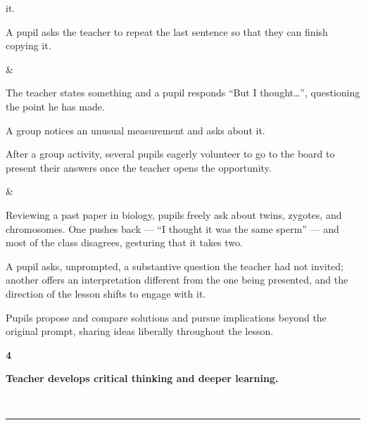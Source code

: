 \documentclass[10pt,a4paper]{article}
\newcommand{\exlistsize}{\scriptsize}
\newcommand{\conceptheader}[2]{%
  \noindent
  \begin{minipage}[c]{13mm}\raggedright
    {\fontsize{30}{30}\selectfont\bfseries\color{tnavy}#1}
  \end{minipage}%
  \begin{minipage}[c]{\dimexpr\linewidth-13mm\relax}\RaggedRight
    {\large\bfseries #2}
  \end{minipage}\\[1.5mm]
  \textcolor{tnavy}{\rule{\linewidth}{1.1pt}}\\[2mm]}
\begin{document}
{\begin{exlist}
        it.
  \item A pupil asks the teacher to repeat the last sentence so that they can finish copying it.
\end{exlist} &
\exlistsize\begin{exlist}
  \item The teacher states something and a pupil responds ``But I thought\ldots{}'', questioning the point
        he has made.
  \item A group notices an unusual measurement and asks about it.
  \item After a group activity, several pupils eagerly volunteer to go to the board to present their answers
        once the teacher opens the opportunity.
\end{exlist} &
\exlistsize\begin{exlist}
  \item Reviewing a past paper in biology, pupils freely ask about twins, zygotes, and chromosomes. One
        pushes back --- ``I thought it was the same sperm'' --- and most of the class disagrees, gesturing
        that it takes two.
  \item A pupil asks, unprompted, a substantive question the teacher had not invited; another offers an
        interpretation different from the one being presented, and the direction of the lesson shifts to
        engage with it.
  \item Pupils propose and compare solutions and pursue implications beyond the original prompt, sharing
        ideas liberally throughout the lesson.
\end{exlist}
}
 

\clearpage


\conceptheader{4}{Teacher develops critical thinking and deeper learning.}
 
\end{document}
